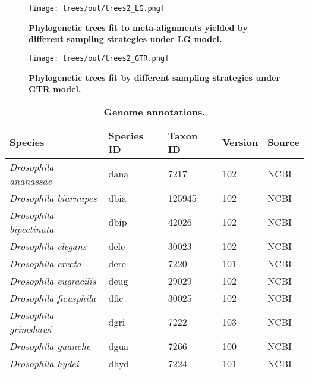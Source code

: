 \begin{figure}[h!]
\texttt{[image: trees/out/trees2\_LG.png]}
\centering
\caption{\textbf{Phylogenetic trees fit to meta-alignments yielded by different sampling strategies under LG model.}}
\label{sfig:trees_LG}
\end{figure}

\begin{figure}[h!]
\texttt{[image: trees/out/trees2\_GTR.png]}
\centering
\caption{\textbf{Phylogenetic trees fit by different sampling strategies under GTR model.}}
\label{sfig:trees_GTR}
\end{figure}

\begin{table}[h!]
\centering
\caption{\textbf{Genome annotations.}}
\label{stable:genomes}
\begin{tabular}{|l|l|l|l|l|}
\hline
\textbf{Species}                       & \textbf{Species ID} & \textbf{Taxon ID} & \textbf{Version} & \textbf{Source} \\ \hline
\textit{Drosophila ananassae}          & dana                & 7217              & 102              & NCBI            \\ \hline
\textit{Drosophila biarmipes}          & dbia                & 125945            & 102              & NCBI            \\ \hline
\textit{Drosophila bipectinata}        & dbip                & 42026             & 102              & NCBI            \\ \hline
\textit{Drosophila elegans}            & dele                & 30023             & 102              & NCBI            \\ \hline
\textit{Drosophila erecta}             & dere                & 7220              & 101              & NCBI            \\ \hline
\textit{Drosophila eugracilis}         & deug                & 29029             & 102              & NCBI            \\ \hline
\textit{Drosophila ficusphila}         & dfic                & 30025             & 102              & NCBI            \\ \hline
\textit{Drosophila grimshawi}          & dgri                & 7222              & 103              & NCBI            \\ \hline
\textit{Drosophila guanche}            & dgua                & 7266              & 100              & NCBI            \\ \hline
\textit{Drosophila hydei}              & dhyd                & 7224              & 101              & NCBI            \\ \hline

\end{tabular}
\end{table}
